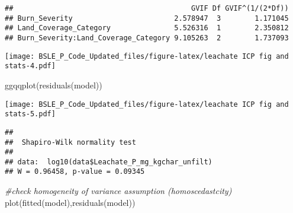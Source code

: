 \documentclass[
]{article}
\newenvironment{Shaded}{\begin{snugshade}}{\end{snugshade}}
\newcommand{\CommentTok}[1]{\textcolor[rgb]{0.56,0.35,0.01}{\textit{#1}}}
\newcommand{\DecValTok}[1]{\textcolor[rgb]{0.00,0.00,0.81}{#1}}
\newcommand{\FloatTok}[1]{\textcolor[rgb]{0.00,0.00,0.81}{#1}}
\newcommand{\FunctionTok}[1]{\textcolor[rgb]{0.00,0.00,0.00}{#1}}
\newcommand{\NormalTok}[1]{#1}
\newcommand{\SpecialCharTok}[1]{\textcolor[rgb]{0.00,0.00,0.00}{#1}}
\begin{document}
\begin{verbatim}
##                                          GVIF Df GVIF^(1/(2*Df))
## Burn_Severity                        2.578947  3        1.171045
## Land_Coverage_Category               5.526316  1        2.350812
## Burn_Severity:Land_Coverage_Category 9.105263  2        1.737093
\end{verbatim}

\begin{Shaded}
\end{Shaded}

\texttt{[image: BSLE\_P\_Code\_Updated\_files/figure-latex/leachate ICP fig and stats-4.pdf]}

\begin{Shaded}
\begin{Highlighting}[]
\FunctionTok{ggqqplot}\NormalTok{(}\FunctionTok{residuals}\NormalTok{(model))}
\end{Highlighting}
\end{Shaded}

\texttt{[image: BSLE\_P\_Code\_Updated\_files/figure-latex/leachate ICP fig and stats-5.pdf]}

\begin{Shaded}
\end{Shaded}

\begin{verbatim}
## 
##  Shapiro-Wilk normality test
## 
## data:  log10(data$Leachate_P_mg_kgchar_unfilt)
## W = 0.96458, p-value = 0.09345
\end{verbatim}

\begin{Shaded}
\begin{Highlighting}[]
\CommentTok{\#check homogeneity of variance assumption (homoscedastcity)}
\FunctionTok{plot}\NormalTok{(}\FunctionTok{fitted}\NormalTok{(model),}\FunctionTok{residuals}\NormalTok{(model))}
\end{Highlighting}
\end{Shaded}
\end{document}

